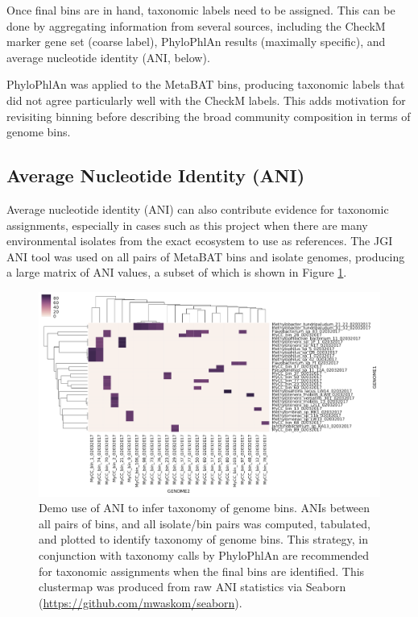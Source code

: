 Once final bins are in hand, taxonomic labels need to be assigned.
This can be done by aggregating information from several sources, including the CheckM marker gene set (coarse label), PhyloPhlAn results (maximally specific), and average nucleotide identity (ANI, below).

PhyloPhlAn was applied to the MetaBAT bins, producing taxonomic labels that did not agree particularly well with the CheckM labels.
This adds motivation for revisiting binning before describing the broad community composition in terms of genome bins.

\subsection{Average Nucleotide Identity (ANI)}

Average nucleotide identity (ANI) can also contribute evidence for taxonomic assignments, especially in cases such as this project when there are many environmental isolates from the exact ecosystem to use as references.
The JGI ANI tool was used on all pairs of MetaBAT bins and isolate genomes, producing a large matrix of ANI values, a subset of which is shown in Figure \ref{fig:ANIs}.

\begin{figure}[H]
\centering
    \includegraphics[width=1.0\textwidth]{./tex/chapter2/figures/170203_demo_of_ANI_heatmap.pdf}
    \begin{singlespace}
    \caption[Demo use of ANI to infer taxonomy of genome bins]{
        Demo use of ANI to infer taxonomy of genome bins.
        ANIs between all pairs of bins, and all isolate/bin pairs was computed, tabulated, and plotted to identify taxonomy of genome bins.
        This strategy, in conjunction with taxonomy calls by PhyloPhlAn \cite{segata2013} are recommended for taxonomic assignments when the final bins are identified.
        This clustermap was produced from raw ANI statistics via Seaborn (\url{https://github.com/mwaskom/seaborn}).}
    \label{fig:ANIs}
    \end{singlespace}
\end{figure}

